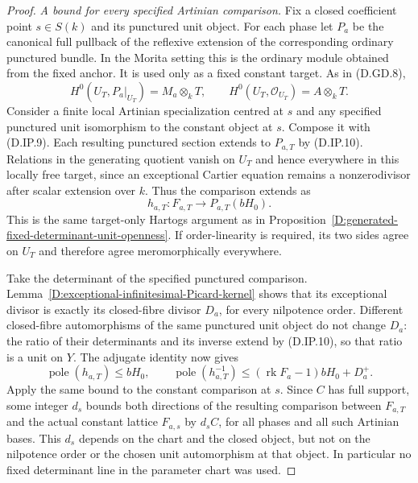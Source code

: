 \begin{proof}
\emph{A bound for every specified Artinian comparison.}
Fix a closed coefficient point $s\in S(k)$ and its
punctured unit object. For each phase let $P_a$ be the
canonical full pullback of the reflexive extension of
the corresponding ordinary punctured bundle. In the
Morita setting this is the ordinary module obtained
from the fixed anchor. It is used only as a fixed
constant target. As in (D.GD.8),
\[
 H^0(U_T,P_a|_{U_T})=M_a\otimes_kT,
 \qquad H^0(U_T,\mathcal O_{U_T})=A\otimes_kT.        \tag{D.IP.10}
\]
Consider a finite local Artinian specialization centred
at $s$ and any specified punctured unit isomorphism to
the constant object at $s$. Compose it with (D.IP.9).
Each resulting punctured section extends to $P_{a,T}$
by (D.IP.10). Relations in the generating quotient
vanish on $U_T$ and hence everywhere in this locally
free target, since an exceptional Cartier equation
remains a nonzerodivisor after scalar extension over
$k$. Thus the comparison extends as
\[
              h_{a,T}:F_{a,T}\longrightarrow P_{a,T}(bH_0).
                                                               \tag{D.IP.11}
\]
This is the same target-only Hartogs argument as in
Proposition~\ref{D:generated-fixed-determinant-unit-openness}.
If order-linearity is required, its two sides agree
on $U_T$ and therefore agree meromorphically everywhere.

Take the determinant of the specified punctured
comparison. Lemma~\ref{D:exceptional-infinitesimal-Picard-kernel}
shows that its exceptional divisor is exactly its
closed-fibre divisor $D_a$, for every nilpotence order.
Different closed-fibre automorphisms of the same
punctured unit object do not change $D_a$: the ratio
of their determinants and its inverse extend by
(D.IP.10), so that ratio is a unit on $Y$.
The adjugate identity now gives
\[
 \operatorname{pole}(h_{a,T})\le bH_0,
 \qquad
 \operatorname{pole}(h_{a,T}^{-1})
                  \le(\operatorname{rk}F_a-1)bH_0+D_a^+.
                                                               \tag{D.IP.12}
\]
Apply the same bound to the constant comparison at $s$.
Since $C$ has full support, some integer $d_s$ bounds
both directions of the resulting comparison between
$F_{a,T}$ and the actual constant lattice $F_{a,s}$
by $d_s C$, for all phases and all such Artinian bases.
This $d_s$ depends on the chart and the closed object,
but not on the nilpotence order or the chosen unit
automorphism at that object. In particular no fixed
determinant line in the parameter chart was used.


\end{proof}
